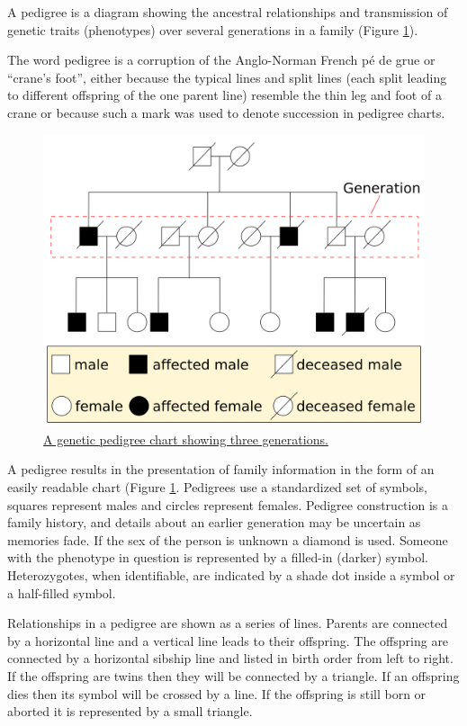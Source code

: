A pedigree is a diagram showing the ancestral relationships and transmission of genetic traits (phenotypes) over several generations in a family (Figure \ref{fig:pedigree}).

The word pedigree is a corruption of the Anglo-Norman French pé de grue or ``crane's foot'', either because the typical lines and split lines (each split leading to different offspring of the one parent line) resemble the thin leg and foot of a crane or because such a mark was used to denote succession in pedigree charts.



\begin{figure}

{\centering \includegraphics[width=0.7\linewidth]{./figures/genetics/Pedigree-chart-example} 

}

\caption{\href{https://commons.wikimedia.org/wiki/File:Pedigree-chart-example.svg}{A genetic pedigree chart showing three generations.}}\label{fig:pedigree}
\end{figure}

A pedigree results in the presentation of family information in the form of an easily readable chart (Figure \ref{fig:pedigree}. Pedigrees use a standardized set of symbols, squares represent males and circles represent females. Pedigree construction is a family history, and details about an earlier generation may be uncertain as memories fade. If the sex of the person is unknown a diamond is used. Someone with the phenotype in question is represented by a filled-in (darker) symbol. Heterozygotes, when identifiable, are indicated by a shade dot inside a symbol or a half-filled symbol.

Relationships in a pedigree are shown as a series of lines. Parents are connected by a horizontal line and a vertical line leads to their offspring. The offspring are connected by a horizontal sibship line and listed in birth order from left to right. If the offspring are twins then they will be connected by a triangle. If an offspring dies then its symbol will be crossed by a line. If the offspring is still born or aborted it is represented by a small triangle.

